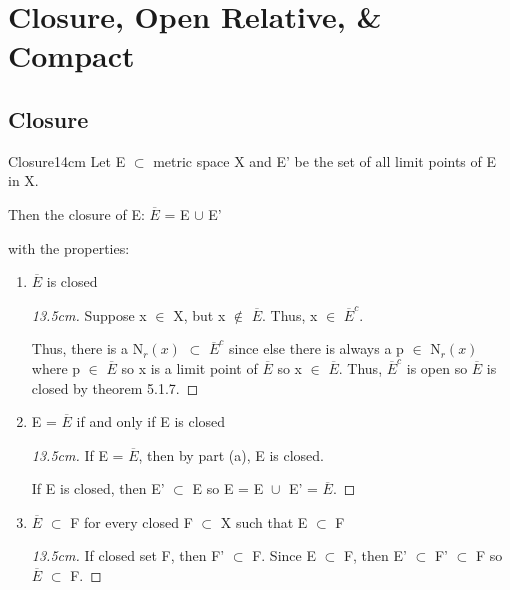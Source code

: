 \newpage
\section[Day 6: Open Relative and Compactness]{ Closure, Open Relative, \& Compact }

\subsection{ Closure }

	\begin{definition}{Closure}{14cm}
		Let E $\subset$ metric space X and E' be the set of all
        limit points of E in X.

        \qquad Then the closure of E:
            \qquad $\overline{E}$ = E $\cup$ E'

        with the properties:
	\end{definition}

	\begin{enumerate}[label=(\alph*), leftmargin=2cm, itemsep=0.1cm]
        \item $\overline{E}$ is closed
        
			\begin{proof}[13.5cm]
				Suppose x $\in$ X, but x $\not \in$ $\overline{E}$.
				Thus, x $\in$ $\overline{E}^c$.

				Thus, there is a N$_r(x)$ $\subset$ $\overline{E}^c$
				since else there is always a p $\in$ N$_r(x)$ where
				p $\in$ $\overline{E}$ so x is a limit point of $\overline{E}$
				so x $\in$ $\overline{E}$.
				Thus, $\overline{E}^c$ is open so $\overline{E}$ is closed by
				{\color{red} theorem 5.1.7}.
			\end{proof}

        \item E = $\overline{E}$ if and only if E is closed
        
			\begin{proof}[13.5cm]
				If E = $\overline{E}$, then by part (a), E is closed.

				If E is closed, then E' $\subset$ E so
				E = E $\cup_{}^{}$ E' = $\overline{E}$.				
			\end{proof}

        \item $\overline{E}$ $\subset$ F for every closed F $\subset$ X
        such that E $\subset$ F

			\begin{proof}[13.5cm]
				If closed set F, then F' $\subset$ F. Since E $\subset$ F, then
				E' $\subset$ F' $\subset$ F so $\overline{E}$ $\subset$ F.			
			\end{proof}
    \end{enumerate}


